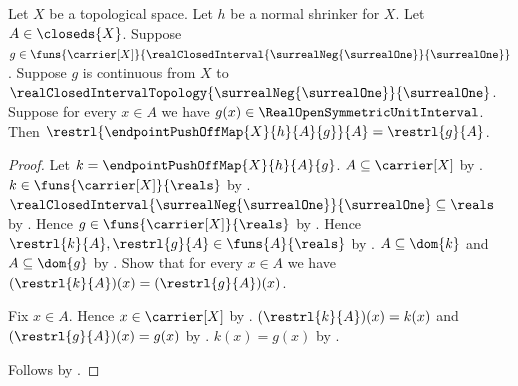 \begin{theorem}\label{endpoint_push_off_map_restriction}
    Let $X$ be a topological space.
    Let $h$ be a normal shrinker for $X$.
    Let $A\in\closeds{X}$.
    Suppose
        $g\in\funs{\carrier[X]}
            {\realClosedInterval
                {\surrealNeg{\surrealOne}}{\surrealOne}}$.
    Suppose $g$ is continuous from $X$ to
        $\realClosedIntervalTopology
            {\surrealNeg{\surrealOne}}{\surrealOne}$.
    Suppose for every $x\in A$ we have
        $g(x)\in\RealOpenSymmetricUnitInterval$.
    Then
        $\restrl{\endpointPushOffMap{X}{h}{A}{g}}{A}
            =\restrl{g}{A}$.
\end{theorem}
\begin{proof}
    Let $k=\endpointPushOffMap{X}{h}{A}{g}$.
    $A\subseteq\carrier[X]$ by .
    $k\in\funs{\carrier[X]}{\reals}$
        by .
    $\realClosedInterval
        {\surrealNeg{\surrealOne}}{\surrealOne}\subseteq\reals$
        by .
    Hence $g\in\funs{\carrier[X]}{\reals}$
        by .
    Hence $\restrl{k}{A},\restrl{g}{A}\in\funs{A}{\reals}$
        by .
    $A\subseteq\dom{k}$ and $A\subseteq\dom{g}$
        by .
    Show that for every $x\in A$ we have
        $(\restrl{k}{A})(x)=(\restrl{g}{A})(x)$.
    \begin{subproof}
        Fix $x\in A$.
        Hence $x\in\carrier[X]$ by .
        $(\restrl{k}{A})(x)=k(x)$ and
            $(\restrl{g}{A})(x)=g(x)$
            by
            .
        $k(x)=g(x)$ by .
    \end{subproof}
    Follows by .
\end{proof}

